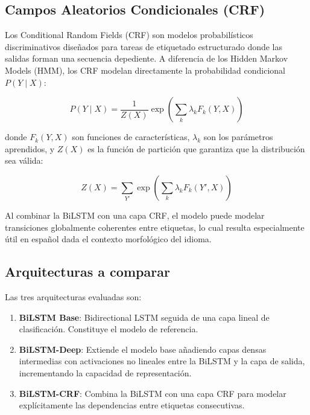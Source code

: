 \documentclass[12pt, a4paper]{article}
\begin{document}

\subsection{Campos Aleatorios Condicionales (CRF)}

Los Conditional Random Fields (CRF) son modelos probabilísticos discriminativos
diseñados para tareas de etiquetado estructurado donde las salidas forman una
secuencia depediente. A diferencia de los Hidden Markov Models (HMM),
los CRF modelan directamente la probabilidad condicional $P(Y \mid X)$:

\begin{equation}
    P(Y \mid X) = \frac{1}{Z(X)} \exp\!\left(\sum_{k} \lambda_k F_k(Y, X)\right)
\end{equation}

\noindent donde $F_k(Y,X)$ son funciones de características, $\lambda_k$ son los
parámetros aprendidos, y $Z(X)$ es la función de partición que garantiza que la
distribución sea válida:

\begin{equation}
    Z(X) = \sum_{Y'} \exp\!\left(\sum_{k} \lambda_k F_k(Y', X)\right)
\end{equation}

Al combinar la BiLSTM con una capa CRF, el modelo puede modelar transiciones
globalmente coherentes entre etiquetas, lo cual resulta especialmente útil en
español dada el contexto morfológico del idioma.

\subsection{Arquitecturas a comparar}

Las tres arquitecturas evaluadas son:

\begin{enumerate}[leftmargin=*, label=\arabic*.]
    \item \textbf{BiLSTM Base}: Bidirectional LSTM seguida de una capa lineal de
          clasificación. Constituye el modelo de referencia.
    \item \textbf{BiLSTM-Deep}: Extiende el modelo base añadiendo capas densas
          intermedias con activaciones no lineales entre la BiLSTM y la capa de
          salida, incrementando la capacidad de representación.
    \item \textbf{BiLSTM-CRF}: Combina la BiLSTM con una capa CRF para modelar
          explícitamente las dependencias entre etiquetas consecutivas.
\end{enumerate}
\end{document}
